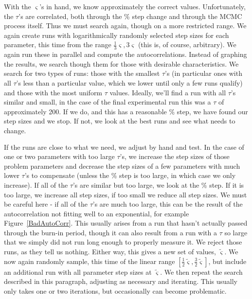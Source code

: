 With the $\varsigma$'s in hand, we know approximately the correct
values.  Unfortunately, the $\tau$'s are correlated, both through the
\% step change and through the MCMC process itself.  Thus we must
search again, though on a more restricted range.  We again create runs
with logarithmically randomly selected step sizes for each parameter,
this time from the range $\frac{1}{3}\varsigma,3\varsigma $ (this is,
of course, arbitrary).  We again run these in parallel and compute the
autocorrelations.  Instead of graphing the results, we search though
them for those with desirable characteristics.  We search for two
types of runs: those with the smallest $\tau$'s (in particular ones
with all $\tau$'s less than a particular value, which we lower until
only a few runs qualify) and those with the most uniform $\tau$
values.  Ideally, we'll find a run with all $\tau$'s similar and
small, in the case of the final experimental run this was a $\tau$ of
approximately 200.  If we do, and this has a reasonable \% step, we
have found our step sizes and we stop.  If not, we look at the best
runs and see what needs to change.

If the runs are close to what we need, we adjust by hand and test.  In
the case of one or two parameters with too large $\tau$'s, we increase
the step sizes of those problem parameters and decrease the step sizes
of a few parameters with much lower $\tau$'s to compensate (unless the
\% step is too large, in which case we only increase).  If all of the
$\tau$'s are similar but too large, we look at the \% step.  If it is
too large, we increase all step sizes, if too small we reduce all step
sizes.  We must be careful here - if all of the $\tau$'s are much too
large, this can be the result of the autocorrelation not fitting well
to an exponential, for example \mbox{Figure \ref{BadAutoCorr}}.  This
usually arises from a run that hasn't actually passed through the
burn-in period, though it can also result from a run with a $\tau$ so
large that we simply did not run long enough to properly measure it.
We reject those runs, as they tell us nothing.  Either way, this gives
a new set of values, $\tilde{\varsigma}$.  We now again randomly
sample, this time of the linear range
$[\frac{1}{2}\tilde{\varsigma},\frac{3}{2}\tilde{\varsigma}]$, but
include an additional run with all parameter step sizes at
$\tilde{\varsigma}$.  We then repeat the search described in this
paragraph, adjusting as necessary and iterating.  This usually only
takes one or two iterations, but occasionally can become problematic.

